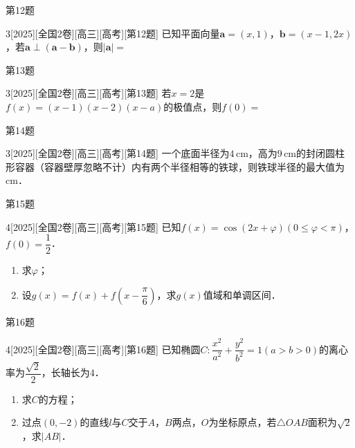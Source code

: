 \begin{frame}[allowframebreaks]{第12题}
\begin{example}{3}[2025][全国2卷][高三][高考][第12题]
已知平面向量$\boldsymbol{a}=(x,1)$，$\boldsymbol{b}=(x-1,2x)$，若$\boldsymbol{a}\perp(\boldsymbol{a}-\boldsymbol{b})$，则$|\boldsymbol{a}|=$\blankline
\end{example}
\end{frame}
\begin{frame}[allowframebreaks]{第13题}
\begin{example}{3}[2025][全国2卷][高三][高考][第13题]
若$x=2$是$f(x)=(x-1)(x-2)(x-a)$的极值点，则$f(0)=$\blankline
\end{example}
\end{frame}
\begin{frame}[allowframebreaks]{第14题}
\begin{example}{3}[2025][全国2卷][高三][高考][第14题]
一个底面半径为$4\,\text{cm}$，高为$9\,\text{cm}$的封闭圆柱形容器（容器壁厚忽略不计）内有两个半径相等的铁球，则铁球半径的最大值为\blankline$\text{cm}$．
\end{example}
\end{frame}
\begin{frame}[allowframebreaks]{第15题}
\begin{example}{4}[2025][全国2卷][高三][高考][第15题]
已知$f(x)=\cos(2x+\varphi)(0\le \varphi<\pi)$，$f(0)=\dfrac{1}{2}$．
\begin{enumerate}
    \item 求$\varphi$；
    \item 设$g(x)=f(x)+f\left(x-\dfrac{\pi}{6}\right)$，求$g(x)$值域和单调区间．
\end{enumerate}
\end{example}
\end{frame}
\begin{frame}[allowframebreaks]{第16题}
\begin{example}{4}[2025][全国2卷][高三][高考][第16题]
已知椭圆$C:\dfrac{x^2}{a^2}+\dfrac{y^2}{b^2}=1(a>b>0)$的离心率为$\dfrac{\sqrt{2}}{2}$，长轴长为$4$．
\begin{enumerate}
    \item 求$C$的方程；
    \item 过点$(0,-2)$的直线$l$与$C$交于$A$，$B$两点，$O$为坐标原点，若$\triangle OAB$面积为$\sqrt{2}$，求$|AB|$．
\end{enumerate}
\end{example}
\end{frame}
